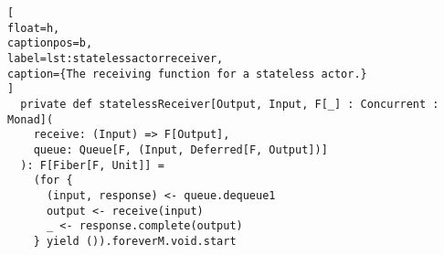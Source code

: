 \documentclass[../main.tex]{subfiles}
\begin{document}
\begin{lstlisting}[
float=h,
captionpos=b,
label=lst:statelessactorreceiver,
caption={The receiving function for a stateless actor.}
]
  private def statelessReceiver[Output, Input, F[_] : Concurrent : Monad](
    receive: (Input) => F[Output],
    queue: Queue[F, (Input, Deferred[F, Output])]
  ): F[Fiber[F, Unit]] =
    (for {
      (input, response) <- queue.dequeue1
      output <- receive(input)
      _ <- response.complete(output)
    } yield ()).foreverM.void.start
\end{lstlisting}
\end{document}
